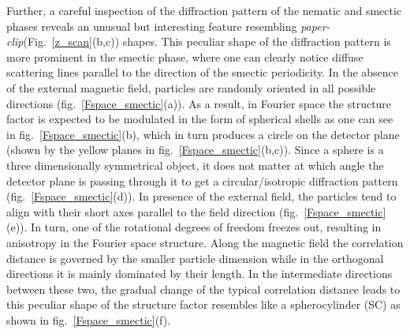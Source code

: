 \documentclass[aps,prl,preprint,superscriptaddress]{revtex4-1}
\begin{document}
Further, a careful inspection of the diffraction pattern of the nematic and smectic phases reveals an unusual but interesting feature resembling \textit{paper-clip}(Fig.~\ref{z_scan}(b,c)) shapes. This peculiar shape of the diffraction pattern is more prominent in the smectic phase, where one can clearly notice diffuse scattering lines parallel to the direction of the smectic periodicity. In the absence of the external magnetic field, particles are randomly oriented in all possible directions (fig.~\ref{Fspace_smectic}(a)). As a result, in Fourier space the structure factor is expected to be modulated in the form of spherical shells as one can see in fig.~\ref{Fspace_smectic}(b), which in turn produces a circle on the detector plane (shown by the yellow planes in fig.~\ref{Fspace_smectic}(b,c)). Since a sphere is a three dimensionally symmetrical object, it does not matter at which angle the detector plane is passing through it to get a circular/isotropic diffraction pattern (fig.~\ref{Fspace_smectic}(d)). In presence of the external field, the particles tend to align with their short axes parallel to the field direction (fig.~\ref{Fspace_smectic}(e)). In turn, one of the rotational degrees of freedom freezes out, resulting in anisotropy in the Fourier space structure. Along the magnetic field the correlation distance is governed by the smaller particle dimension while in the orthogonal directions it is mainly dominated by their length. In the intermediate directions between these two, the gradual change of the typical correlation distance leads to this peculiar shape of the structure factor resembles like a spherocylinder (SC) as shown in fig.~\ref{Fspace_smectic}(f). 
\end{document}
